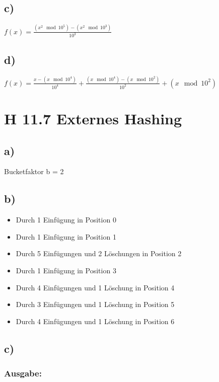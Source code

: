 \documentclass[a4paper]{article}
\begin{document}
\subsection*{c)}

$f(x) = \frac{(x^2 \mod{10^5}) - (x^2 \mod{10^3})} {10^3}$

\subsection*{d)}

$f(x) = \frac{ x             - (x \mod{10^4})} {10^4} +
        \frac{(x \mod{10^4}) - (x \mod{10^2})} {10^2} + (x \mod{10^2})$

\clearpage
\section*{H 11.7 Externes Hashing}

\subsection*{a)}

Bucketfaktor b = 2

\subsection*{b)}

\begin{itemize}
	\item Durch 1 Einfügung in Position 0
	\item Durch 1 Einfügung in Position 1
	\item Durch 5 Einfügungen und 2 Löschungen in Position 2
	\item Durch 1 Einfügung in Position 3
	\item Durch 4 Einfügungen und 1 Löschung in Position 4
	\item Durch 3 Einfügungen und 1 Löschung in Position 5
	\item Durch 4 Einfügungen und 1 Löschung in Position 6
\end{itemize}

\subsection*{c)}



\subsubsection*{Ausgabe:}
\end{document}
